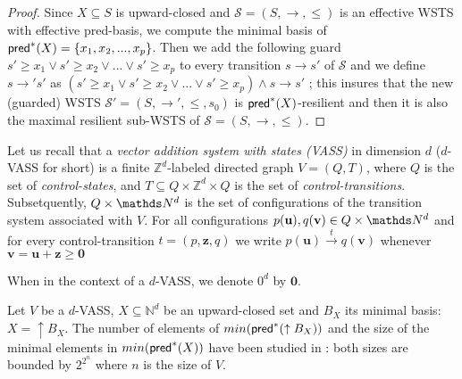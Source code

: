 \begin{proof}
Since $X \subseteq S$ is upward-closed and $\mathscr{S}=(S, \rightarrow, \leq)$ is an effective WSTS with effective pred-basis, we compute the minimal basis of $\textsf{pred}^*(X)=\{x_1,x_2,...,x_p\}$. 
%
%
Then we add the following guard $s' \geq x_1  	\vee s' \geq x_2  	\vee...	\vee s' \geq x_p$ to every transition $s \rightarrow s'$ of $\mathscr{S}$ and we define  $s \rightarrow' s'$ as $(s' \geq x_1  	\vee s' \geq x_2  	\vee...	\vee s' \geq x_p) \wedge s \rightarrow s'$ ; this insures that the new (guarded) WSTS $\mathscr{S'}=(S, \rightarrow', \leq,s_0)$ is $\textsf{pred}^*(X)$-resilient and then it is also the maximal resilient sub-WSTS of $\mathscr{S}=(S, \rightarrow, \leq)$.
\end{proof}
%
%
%
Let us recall that a {\em vector addition system with states (VASS)} in dimension $d$ ($d$-VASS for short) is a finite $\mathds{Z}^d$-labeled directed graph $V = (Q,T)$, where $Q$ is the set of {\em control-states}, and $T \subseteq Q \times \mathds{Z}^d \times Q$ is the set of {\em control-transitions}. 
%
Subsetquently, $Q \times \N^d$ is the set of configurations of the transition system associated with $V$.
For all configurations $p(\textbf{u}), q(\textbf{v}) \in Q \times \N^d$ and for every control-transition $t = (p, \textbf{z}, q)$ we write $p(\textbf{u}) \xrightarrow{t} q(\textbf{v})$ whenever $\textbf{v} = \textbf{u} + \textbf{z} \geq \textbf{0}$
%
\iffalse \mathieu{Defining it like this makes it a LTS rather than a unlabeled TS - maybe talk about how we can 'forget' the labels to obtain an unlabeled TS ?}
\alain{les VASS ne sont pas vraiment étiquetés, sauf si on veut le faire, car on peut dire que les VASS sont définis à partir d'un nombre fini de control-transitions  $t = (p, \textbf{z}, q)$ générant une infinité de transtions notées $p(\textbf{u}) \xrightarrow{t} q(\textbf{v})$ puisque pour tout s, $p(\textbf{u+s}) \xrightarrow{t} q(\textbf{v+s})$} \fi
When in the context of a $d$-VASS, we denote $0^d$ by $\textbf{0}$.

\noindent

Let  $V$ be a $d$-VASS, $X \subseteq \mathds{N}^d$ be an upward-closed set and $B_X$ its minimal basis: $X=\uparrow B_X$. The number of elements of $min(\textsf{pred}^*(\uparrow B_X))$ and the size of the minimal elements in $min(\textsf{pred}^*(X))$ have been studied in
\cite{DBLP:conf/rp/BozzelliG11}: both sizes are bounded by $2^{2^n}$ where $n$ is the size of $V$.

